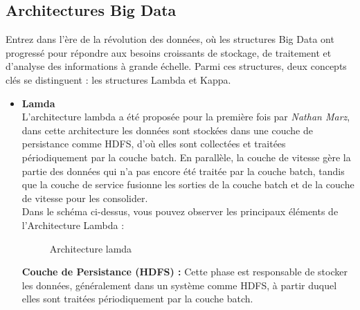 \documentclass{report}
\begin{document}
\subsection{Architectures Big Data}
Entrez dans l'ère de la révolution des données, où les structures Big Data ont progressé pour répondre aux besoins croissants de stockage, de traitement et d'analyse des informations à grande échelle. Parmi ces structures, deux concepts clés se distinguent : les structures Lambda et Kappa.

\begin{itemize}
\item  {\large\textbf{Lamda}} \\
L’architecture lambda a été proposée pour la première fois par \textit{Nathan Marz}, dans cette architecture les données sont stockées dans une couche de persistance comme HDFS, d'où elles sont collectées et traitées périodiquement par la couche batch. En parallèle, la couche de vitesse gère la partie des données qui n'a pas encore été traitée par la couche batch, tandis que la couche de service fusionne les sorties de la couche batch et de la couche de vitesse pour les consolider. \cite{Wingerath et al.,Real-time streaming analytics for Big Data, 2016}  \\
Dans le schéma ci-dessus, vous pouvez observer les principaux éléments de l'Architecture Lambda :
\vspace*{1cm}
  \begin{figure}[h]
        \centering
        \caption{ Architecture lamda \cite{[Wingerath et al.,2016}}
        \label{b}
    \end{figure}
\newpage
\textbf{Couche de Persistance (HDFS) :} Cette phase est responsable de stocker les données, généralement dans un système comme HDFS, à partir duquel elles sont traitées périodiquement par la couche batch.\\


\end{itemize}
\end{document}
